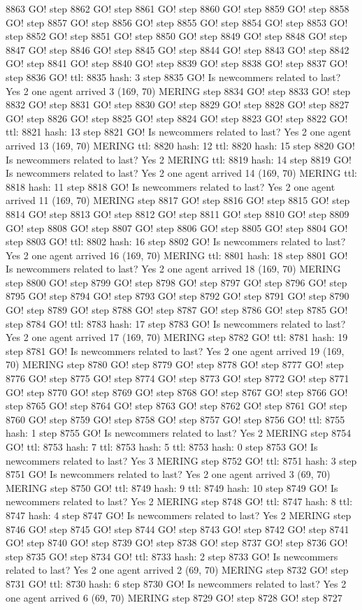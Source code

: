 8863 GO! step 8862 GO! step 8861 GO! step 8860 GO! step 8859 GO! step 8858 GO! step 8857 GO! step 8856 GO! step 8855 GO! step 8854 GO! step 8853 GO! step 8852 GO! step 8851 GO! step 8850 GO! step 8849 GO! step 8848 GO! step 8847 GO! step 8846 GO! step 8845 GO! step 8844 GO! step 8843 GO! step 8842 GO! step 8841 GO! step 8840 GO! step 8839 GO! step 8838 GO! step 8837 GO! step 8836 GO! ttl: 8835 hash: 3 step 8835 GO! Is newcommers related to last? Yes 2 one agent arrived 3 (169, 70) MERING step 8834 GO! step 8833 GO! step 8832 GO! step 8831 GO! step 8830 GO! step 8829 GO! step 8828 GO! step 8827 GO! step 8826 GO! step 8825 GO! step 8824 GO! step 8823 GO! step 8822 GO! ttl: 8821 hash: 13 step 8821 GO! Is newcommers related to last? Yes 2 one agent arrived 13 (169, 70) MERING ttl: 8820 hash: 12 ttl: 8820 hash: 15 step 8820 GO! Is newcommers related to last? Yes 2 MERING ttl: 8819 hash: 14 step 8819 GO! Is newcommers related to last? Yes 2 one agent arrived 14 (169, 70) MERING ttl: 8818 hash: 11 step 8818 GO! Is newcommers related to last? Yes 2 one agent arrived 11 (169, 70) MERING step 8817 GO! step 8816 GO! step 8815 GO! step 8814 GO! step 8813 GO! step 8812 GO! step 8811 GO! step 8810 GO! step 8809 GO! step 8808 GO! step 8807 GO! step 8806 GO! step 8805 GO! step 8804 GO! step 8803 GO! ttl: 8802 hash: 16 step 8802 GO! Is newcommers related to last? Yes 2 one agent arrived 16 (169, 70) MERING ttl: 8801 hash: 18 step 8801 GO! Is newcommers related to last? Yes 2 one agent arrived 18 (169, 70) MERING step 8800 GO! step 8799 GO! step 8798 GO! step 8797 GO! step 8796 GO! step 8795 GO! step 8794 GO! step 8793 GO! step 8792 GO! step 8791 GO! step 8790 GO! step 8789 GO! step 8788 GO! step 8787 GO! step 8786 GO! step 8785 GO! step 8784 GO! ttl: 8783 hash: 17 step 8783 GO! Is newcommers related to last? Yes 2 one agent arrived 17 (169, 70) MERING step 8782 GO! ttl: 8781 hash: 19 step 8781 GO! Is newcommers related to last? Yes 2 one agent arrived 19 (169, 70) MERING step 8780 GO! step 8779 GO! step 8778 GO! step 8777 GO! step 8776 GO! step 8775 GO! step 8774 GO! step 8773 GO! step 8772 GO! step 8771 GO! step 8770 GO! step 8769 GO! step 8768 GO! step 8767 GO! step 8766 GO! step 8765 GO! step 8764 GO! step 8763 GO! step 8762 GO! step 8761 GO! step 8760 GO! step 8759 GO! step 8758 GO! step 8757 GO! step 8756 GO! ttl: 8755 hash: 1 step 8755 GO! Is newcommers related to last? Yes 2 MERING step 8754 GO! ttl: 8753 hash: 7 ttl: 8753 hash: 5 ttl: 8753 hash: 0 step 8753 GO! Is newcommers related to last? Yes 3 MERING step 8752 GO! ttl: 8751 hash: 3 step 8751 GO! Is newcommers related to last? Yes 2 one agent arrived 3 (69, 70) MERING step 8750 GO! ttl: 8749 hash: 9 ttl: 8749 hash: 10 step 8749 GO! Is newcommers related to last? Yes 2 MERING step 8748 GO! ttl: 8747 hash: 8 ttl: 8747 hash: 4 step 8747 GO! Is newcommers related to last? Yes 2 MERING step 8746 GO! step 8745 GO! step 8744 GO! step 8743 GO! step 8742 GO! step 8741 GO! step 8740 GO! step 8739 GO! step 8738 GO! step 8737 GO! step 8736 GO! step 8735 GO! step 8734 GO! ttl: 8733 hash: 2 step 8733 GO! Is newcommers related to last? Yes 2 one agent arrived 2 (69, 70) MERING step 8732 GO! step 8731 GO! ttl: 8730 hash: 6 step 8730 GO! Is newcommers related to last? Yes 2 one agent arrived 6 (69, 70) MERING step 8729 GO! step 8728 GO! step 8727 